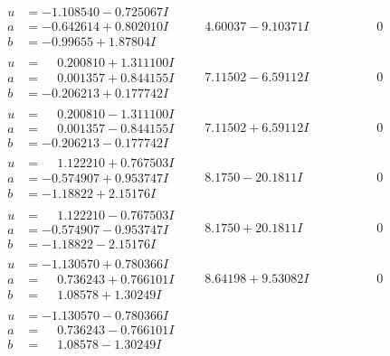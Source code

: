 \documentclass[1p]{elsarticle_modified}
\theoremstyle{definition}
\begin{document}
$$\begin{array}{c|c|c}
\begin{aligned}
u &= -1.108540 - 0.725067 I \\
a &= -0.642614 + 0.802010 I \\
b &= -0.99655 + 1.87804 I\end{aligned}
 & \phantom{-}4.60037 - 9.10371 I & \phantom{-0.000000 } 0 \\ \hline\begin{aligned}
u &= \phantom{-}0.200810 + 1.311100 I \\
a &= \phantom{-}0.001357 + 0.844155 I \\
b &= -0.206213 + 0.177742 I\end{aligned}
 & \phantom{-}7.11502 - 6.59112 I & \phantom{-0.000000 } 0 \\ \hline\begin{aligned}
u &= \phantom{-}0.200810 - 1.311100 I \\
a &= \phantom{-}0.001357 - 0.844155 I \\
b &= -0.206213 - 0.177742 I\end{aligned}
 & \phantom{-}7.11502 + 6.59112 I & \phantom{-0.000000 } 0 \\ \hline\begin{aligned}
u &= \phantom{-}1.122210 + 0.767503 I \\
a &= -0.574907 + 0.953747 I \\
b &= -1.18822 + 2.15176 I\end{aligned}
 & \phantom{-}8.1750 - 20.1811 I & \phantom{-0.000000 } 0 \\ \hline\begin{aligned}
u &= \phantom{-}1.122210 - 0.767503 I \\
a &= -0.574907 - 0.953747 I \\
b &= -1.18822 - 2.15176 I\end{aligned}
 & \phantom{-}8.1750 + 20.1811 I & \phantom{-0.000000 } 0 \\ \hline\begin{aligned}
u &= -1.130570 + 0.780366 I \\
a &= \phantom{-}0.736243 + 0.766101 I \\
b &= \phantom{-}1.08578 + 1.30249 I\end{aligned}
 & \phantom{-}8.64198 + 9.53082 I & \phantom{-0.000000 } 0 \\ \hline\begin{aligned}
u &= -1.130570 - 0.780366 I \\
a &= \phantom{-}0.736243 - 0.766101 I \\
b &= \phantom{-}1.08578 - 1.30249 I\end{aligned}

\end{array}$$
\end{document}

